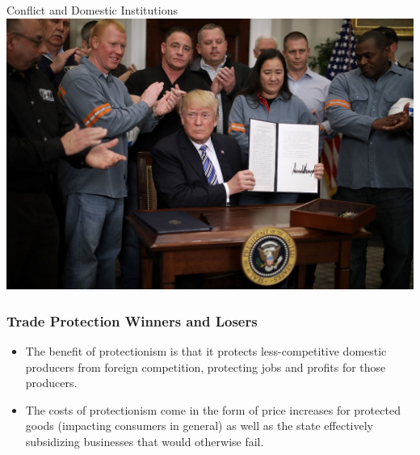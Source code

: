 \documentclass[handout]{beamer}
\begin{document}
\begin{frame}{\LARGE Conflict and Domestic Institutions}
	\centering
	\includegraphics[width=\textwidth,height=0.9\textheight,keepaspectratio]{trump.jpg}
\end{frame}

\begin{frame} 
	\frametitle{\LARGE Trade Protection Winners and Losers}
	\begin{itemize}
		\item The benefit of protectionism is that it protects less-competitive domestic producers from foreign competition, protecting jobs and profits for those producers. \pause
		\item The costs of protectionism come in the form of price increases for protected goods (impacting consumers in general) as well as the state effectively subsidizing businesses that would otherwise fail. 
	\end{itemize}
\end{frame}
\end{document}
